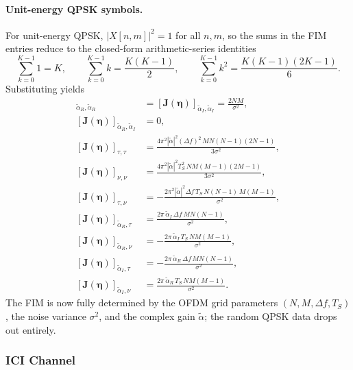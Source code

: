 \documentclass[11pt]{article}
\begin{document}
\paragraph{Unit-energy QPSK symbols.} For unit-energy QPSK, \(|X[n,m]|^2 = 1\) for all \(n,m\), so the sums in the FIM entries reduce to the closed-form arithmetic-series identities
\begin{equation}
    \sum_{k=0}^{K-1} 1 = K, \qquad \sum_{k=0}^{K-1} k = \frac{K(K-1)}{2}, \qquad \sum_{k=0}^{K-1} k^2 = \frac{K(K-1)(2K-1)}{6}.
\end{equation}
Substituting yields
\begin{align}
    [\bm{J}(\bm{\eta})]_{\tilde{\alpha}_{R}, \tilde{\alpha}_{R}} &= [\bm{J}(\bm{\eta})]_{\tilde{\alpha}_{I}, \tilde{\alpha}_{I}} = \frac{2 N M}{\sigma^2}, \\
    [\bm{J}(\bm{\eta})]_{\tilde{\alpha}_{R}, \tilde{\alpha}_{I}} &= 0, \\
    [\bm{J}(\bm{\eta})]_{\tau, \tau} &= \frac{4\pi^2 |\tilde{\alpha}|^2 (\Delta f)^2\, M N (N-1)(2N-1)}{3\sigma^2}, \\
    [\bm{J}(\bm{\eta})]_{\nu, \nu} &= \frac{4\pi^2 |\tilde{\alpha}|^2 T_S^2\, N M (M-1)(2M-1)}{3\sigma^2}, \\
    [\bm{J}(\bm{\eta})]_{\tau, \nu} &= -\frac{2\pi^2 |\tilde{\alpha}|^2 \Delta f\, T_S\, N(N-1)\, M(M-1)}{\sigma^2}, \\
    [\bm{J}(\bm{\eta})]_{\tilde{\alpha}_{R}, \tau} &= \frac{2\pi\, \tilde{\alpha}_I\, \Delta f\, M N (N-1)}{\sigma^2}, \\
    [\bm{J}(\bm{\eta})]_{\tilde{\alpha}_{R}, \nu} &= -\frac{2\pi\, \tilde{\alpha}_I\, T_S\, N M (M-1)}{\sigma^2}, \\
    [\bm{J}(\bm{\eta})]_{\tilde{\alpha}_{I}, \tau} &= -\frac{2\pi\, \tilde{\alpha}_R\, \Delta f\, M N (N-1)}{\sigma^2}, \\
    [\bm{J}(\bm{\eta})]_{\tilde{\alpha}_{I}, \nu} &= \frac{2\pi\, \tilde{\alpha}_R\, T_S\, N M (M-1)}{\sigma^2}.
\end{align}
The FIM is now fully determined by the OFDM grid parameters \((N, M, \Delta f, T_S)\), the noise variance \(\sigma^2\), and the complex gain \(\tilde{\alpha}\); the random QPSK data drops out entirely.

\subsubsection{ICI Channel}
\end{document}
